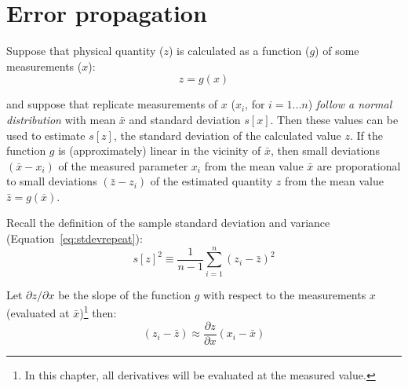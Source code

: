 \section{Error propagation}
\label{sec:linearerrorprop}

Suppose that physical quantity ($z$) is calculated as a function ($g$)
of some measurements ($x$):
\begin{equation}
z = g(x)
\label{eq:zgx}
\end{equation}

\noindent and suppose that replicate measurements of $x$ ($x_i$, for
$i=1...n$) \emph{follow a normal distribution} with mean $\bar{x}$ and
standard deviation $s[x]$. Then these values can be used to estimate
$s[z]$, the standard deviation of the calculated value $z$.  If the
function $g$ is (approximately) linear in the vicinity of $\bar{x}$,
then small deviations $(\bar{x}-x_i)$ of the measured parameter $x_i$
from the mean value $\bar{x}$ are proporational to small deviations
$(\bar{z}-z_i)$ of the estimated quantity $z$ from the mean value
$\bar{z}=g(\overline{x})$.\medskip

Recall the definition of the sample standard deviation and variance
(Equation~\ref{eq:stdevrepeat}):
\begin{equation}
s[z]^2 \equiv \frac{1}{n-1} \sum_{i=1}^{n} (z_i-\bar{z})^2
\label{eq:varz}
\end{equation}

Let $\partial{z}/\partial{x}$ be the slope of the function $g$ with
respect to the measurements $x$ (evaluated at $\bar{x}$)\footnote{In
  this chapter, all derivatives will be evaluated at the measured
  value.} then:
\begin{equation}
(z_i-\bar{z}) \approx \frac{\partial z}{\partial x} (x_i-\bar{x})
\label{eq:zi-z}
\end{equation}

